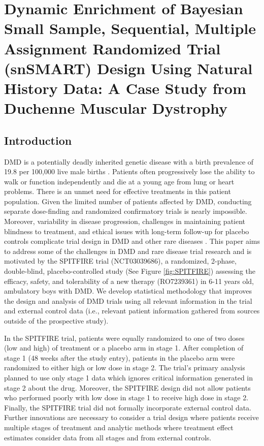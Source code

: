 \chapter{Dynamic Enrichment of Bayesian Small Sample, Sequential, Multiple Assignment Randomized Trial (snSMART) Design Using Natural History Data: A Case Study from Duchenne Muscular Dystrophy}
\label{chpt:snSMART}

\section{Introduction}
\label{s:intro}
\ac{DMD} is a potentially deadly inherited genetic disease with a birth prevalence of 19.8 per 100,000 live male births \citep{crisafulli2020global}. Patients often progressively lose the ability to walk or function independently and die at a young age from lung or heart problems. There is an unmet need for effective treatments in this patient population. Given the limited number of patients affected by \ac{DMD}, conducting separate dose-finding and randomized confirmatory trials is nearly impossible. Moreover, variability in disease progression, challenges in maintaining patient blindness to treatment, and ethical issues with long-term follow-up for placebo controls complicate trial design in \ac{DMD} and other rare diseases \citep{MUNTONI2022271}. This paper aims to address some of the challenges in \ac{DMD} and rare disease trial research and is motivated by the SPITFIRE trial (NCT03039686), a randomized, 2-phase, double-blind, placebo-controlled study (See Figure \ref{fig:SPITFIRE}) assessing the efficacy, safety, and tolerability of a new therapy (RO7239361) in 6-11 years old, ambulatory boys with \ac{DMD}.  We develop statistical methodology that improves the design and analysis of \ac{DMD} trials using all relevant information in the trial and external control data (i.e., relevant patient information gathered from sources outside of the prospective study).

In the SPITFIRE trial, patients were equally randomized to one of two doses (low and high) of treatment or a placebo arm in stage 1. After completion of stage 1 (48 weeks after the study entry), patients in the placebo arm were randomized to either high or low dose in stage 2. The trial's primary analysis planned to use only stage 1 data which ignores critical information generated in stage 2 about the drug. Moreover, the SPITFIRE design did not allow patients who performed poorly with low dose in stage 1 to receive high dose in stage 2. Finally, the SPITFIRE trial did not formally incorporate external control data. Further innovations are necessary to consider a trial design where patients receive multiple stages of treatment and analytic methods where treatment effect estimates consider data from all stages and from external controls.

